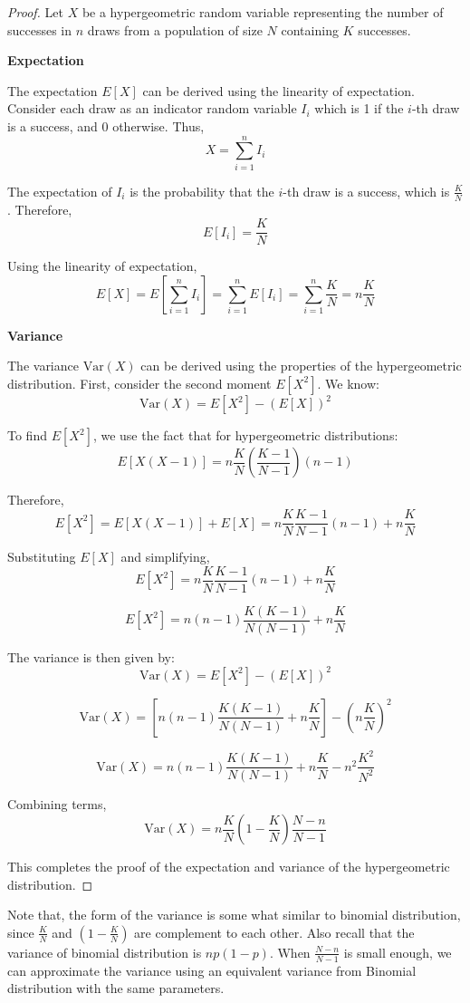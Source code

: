 \begin{proof}
Let \(X\) be a hypergeometric random variable representing the number of successes in \(n\) draws from a population of size \(N\) containing \(K\) successes.

\textbf{Expectation}

The expectation \(E[X]\) can be derived using the linearity of expectation. Consider each draw as an indicator random variable \(I_i\) which is 1 if the \(i\)-th draw is a success, and 0 otherwise. Thus,
\[
X = \sum_{i=1}^{n} I_i
\]

The expectation of \(I_i\) is the probability that the \(i\)-th draw is a success, which is \(\frac{K}{N}\). Therefore,
\[
E[I_i] = \frac{K}{N}
\]

Using the linearity of expectation,
\[
E[X] = E\left[\sum_{i=1}^{n} I_i\right] = \sum_{i=1}^{n} E[I_i] = \sum_{i=1}^{n} \frac{K}{N} = n \frac{K}{N}
\]

\textbf{Variance}

The variance \(\text{Var}(X)\) can be derived using the properties of the hypergeometric distribution. First, consider the second moment \(E[X^2]\). We know:
\[
\text{Var}(X) = E[X^2] - (E[X])^2
\]

To find \(E[X^2]\), we use the fact that for hypergeometric distributions:
\[
E[X(X-1)] = n \frac{K}{N} \left(\frac{K-1}{N-1}\right) (n-1)
\]

Therefore,
\[
E[X^2] = E[X(X-1)] + E[X] = n \frac{K}{N} \frac{K-1}{N-1} (n-1) + n \frac{K}{N}
\]

Substituting \(E[X]\) and simplifying,
\[
E[X^2] = n \frac{K}{N} \frac{K-1}{N-1} (n-1) + n \frac{K}{N}
\]

\[
E[X^2] = n(n-1) \frac{K(K-1)}{N(N-1)} + n \frac{K}{N}
\]

The variance is then given by:
\[
\text{Var}(X) = E[X^2] - (E[X])^2
\]

\[
\text{Var}(X) = \left[ n(n-1) \frac{K(K-1)}{N(N-1)} + n \frac{K}{N} \right] - \left( n \frac{K}{N} \right)^2
\]

\[
\text{Var}(X) = n(n-1) \frac{K(K-1)}{N(N-1)} + n \frac{K}{N} - n^2 \frac{K^2}{N^2}
\]

Combining terms,
\[
\text{Var}(X) = n \frac{K}{N} \left(1 - \frac{K}{N}\right) \frac{N-n}{N-1}
\]

This completes the proof of the expectation and variance of the hypergeometric distribution.
\end{proof}

Note that, the form of the variance is some what similar to binomial distribution, since $\frac{K}{N}$  and   $ \left(1 - \frac{K}{N}\right)$
are complement to each other. Also recall that the variance of binomial distribution is $np(1-p)$. When $\frac{N - n}{N - 1}$ is small enough, we can approximate the variance using an equivalent variance from Binomial distribution with the same parameters.

